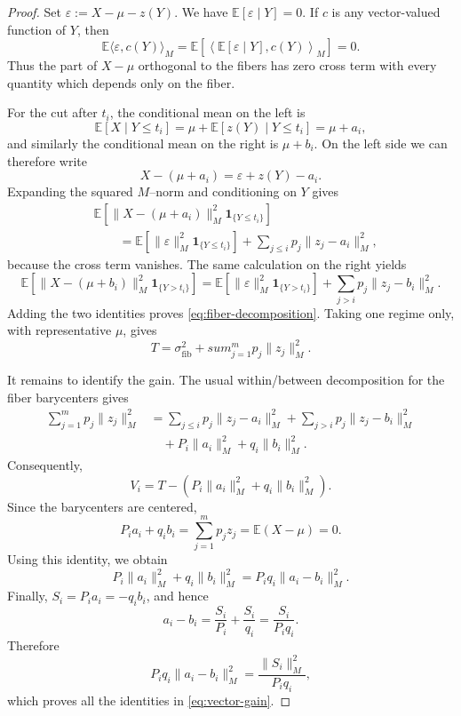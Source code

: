 \documentclass[10pt,a4paper]{amsart}
\begin{document}
\begin{proof}
Set $\varepsilon:=X-\mu-z(Y)$.  We have
$\mathbb E[\varepsilon\mid Y]=0$.  If $c$ is any vector-valued function of
$Y$, then
\[
 \mathbb E\langle\varepsilon,c(Y)\rangle_M
 =\mathbb E\left[
   \left\langle\mathbb E[\varepsilon\mid Y],c(Y)\right\rangle_M
  \right]=0.
\]
Thus the part of $X-\mu$ orthogonal to the fibers has zero cross term with
every quantity which depends only on the fiber.

For the cut after $t_i$, the conditional mean on the left is
\[
 \mathbb E[X\mid Y\leq t_i]
 =\mu+\mathbb E[z(Y)\mid Y\leq t_i]
 =\mu+a_i,
\]
and similarly the conditional mean on the right is $\mu+b_i$.  On the left
side we can therefore write
\[
 X-(\mu+a_i)=\varepsilon+z(Y)-a_i.
\]
Expanding the squared $M$--norm and conditioning on $Y$ gives
\begin{align*}
 &\mathbb E\left[
   \|X-(\mu+a_i)\|_M^2\mathbf 1_{\{Y\leq t_i\}}
  \right]\\
 &\qquad=
 \mathbb E\left[\|\varepsilon\|_M^2
                 \mathbf 1_{\{Y\leq t_i\}}\right]
 +\sum_{j\leq i}p_j\|z_j-a_i\|_M^2,
\end{align*}
because the cross term vanishes.  The same calculation on the right yields
\[
 \mathbb E\left[
   \|X-(\mu+b_i)\|_M^2\mathbf 1_{\{Y>t_i\}}
  \right]
 =\mathbb E\left[\|\varepsilon\|_M^2
                 \mathbf 1_{\{Y>t_i\}}\right]
 +\sum_{j>i}p_j\|z_j-b_i\|_M^2.
\]
Adding the two identities proves \eqref{eq:fiber-decomposition}.  Taking one
regime only, with representative $\mu$, gives
\[
 T=\sigma^2_{\mathrm{fib}}+sum_{j=1}^m p_j\|z_j\|_M^2.
\]

It remains to identify the gain.  The usual within/between decomposition for
the fiber barycenters gives
\begin{align*}
 \sum_{j=1}^m p_j\|z_j\|_M^2
 &=\sum_{j\leq i}p_j\|z_j-a_i\|_M^2
   +\sum_{j>i}p_j\|z_j-b_i\|_M^2\\
 &\quad+P_i\|a_i\|_M^2+q_i\|b_i\|_M^2.
\end{align*}
Consequently,
\[
 V_i=T-\left(P_i\|a_i\|_M^2+q_i\|b_i\|_M^2\right).
\]
Since the barycenters are centered,
\[
 P_i a_i+q_i b_i=\sum_{j=1}^m p_jz_j
 =\mathbb E(X-\mu)=0.
\]
Using this identity, we obtain
\[
 P_i\|a_i\|_M^2+q_i\|b_i\|_M^2
 =P_iq_i\|a_i-b_i\|_M^2.
\]
Finally, $S_i=P_i a_i=-q_i b_i$, and hence
\[
 a_i-b_i=\frac{S_i}{P_i}+\frac{S_i}{q_i}
          =\frac{S_i}{P_iq_i}.
\]
Therefore
\[
 P_iq_i\|a_i-b_i\|_M^2
 =\frac{\|S_i\|_M^2}{P_iq_i},
\]
which proves all the identities in \eqref{eq:vector-gain}.
\end{proof}
\end{document}
